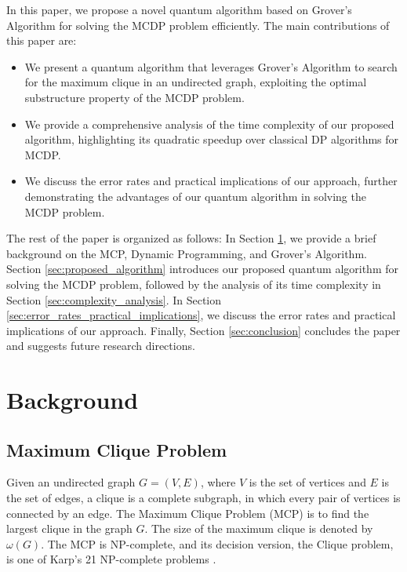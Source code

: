 In this paper, we propose a novel quantum algorithm based on Grover's Algorithm for solving the MCDP problem efficiently. The main contributions of this paper are:

\begin{itemize}
    \item We present a quantum algorithm that leverages Grover's Algorithm to search for the maximum clique in an undirected graph, exploiting the optimal substructure property of the MCDP problem.
    \item We provide a comprehensive analysis of the time complexity of our proposed algorithm, highlighting its quadratic speedup over classical DP algorithms for MCDP.
    \item We discuss the error rates and practical implications of our approach, further demonstrating the advantages of our quantum algorithm in solving the MCDP problem.
\end{itemize}

The rest of the paper is organized as follows: In Section \ref{sec:background}, we provide a brief background on the MCP, Dynamic Programming, and Grover's Algorithm. Section \ref{sec:proposed_algorithm} introduces our proposed quantum algorithm for solving the MCDP problem, followed by the analysis of its time complexity in Section \ref{sec:complexity_analysis}. In Section \ref{sec:error_rates_practical_implications}, we discuss the error rates and practical implications of our approach. Finally, Section \ref{sec:conclusion} concludes the paper and suggests future research directions.

\section{Background}\label{sec:background}

\subsection{Maximum Clique Problem}

Given an undirected graph $G=(V, E)$, where $V$ is the set of vertices and $E$ is the set of edges, a clique is a complete subgraph, in which every pair of vertices is connected by an edge. The Maximum Clique Problem (MCP) is to find the largest clique in the graph $G$. The size of the maximum clique is denoted by $\omega(G)$. The MCP is NP-complete, and its decision version, the Clique problem, is one of Karp's 21 NP-complete problems \cite{Karp1972}.

